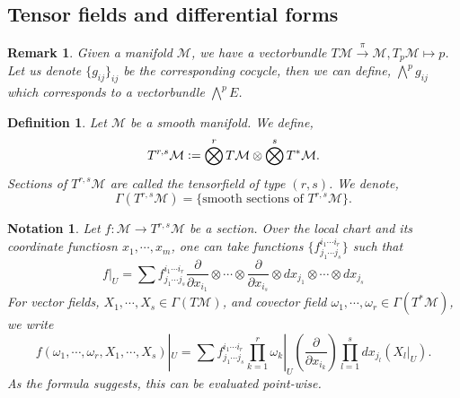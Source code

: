 \documentclass[8pt]{article}
\newtheorem{definition}{Definition}[section]
\newtheorem{notation}{Notation}[section]
\newtheorem{remark}{Remark}[section]
\newcommand{\defeq}{\vcentcolon=}
\newcommand{\M}[0]{\mathcal{M}}
\newcommand{\pd}[2]{{\frac {\partial #1} {\partial #2}}}
\begin{document}

\subsection{Tensor fields and differential forms}

\begin{remark}
  Given a manifold $\M$, we have a vectorbundle $T\M\stackrel{\pi}{\to}\M, T_p\M\mapsto p$. Let us denote $\{g_{ij}\}_{ij}$ be the corresponding cocycle, 
  then we can define, $\bigwedge^p g_{ij}$ which corresponds to a vectorbundle $\bigwedge^pE$. 
\end{remark}

\begin{definition}
  Let $\M$ be a smooth manifold. We define,
  \begin{equation*}
    T^{r,s}\M\defeq\bigotimes^rT\M\otimes\bigotimes^sT^*\M.
  \end{equation*}
  Sections of $T^{r,s}\M$ are called the tensorfield of type $(r,s)$. We denote,
  \begin{equation*}
    \Gamma(T^{r,s}\M) = \{\text{smooth sections of $T^{r,s}\M$}\}.
  \end{equation*}
\end{definition}

\begin{notation}
  Let $f:\M\to T^{r,s}\M$ be a section. Over the local chart and its coordinate functiosn $x_1,\cdots,x_m$, one can take functions $\{f_{j_1\cdots j_s}^{i_1\cdots i_r}\}$ such that
  \begin{equation}
    \label{local_chart_section}
        f|_U = \sum f_{j_1\cdots j_s}^{i_1\cdots i_r}\pd{}{x_{i_1}}\otimes\cdots\otimes \pd{}{x_{i_s}}\otimes dx_{j_1}\otimes \cdots\otimes dx_{j_s}
  \end{equation}
  For vector fields, $X_1,\cdots,X_s\in\Gamma(T\M)$, and covector field $\omega_1,\cdots,\omega_r\in\Gamma(T^*\M)$, we write 
  \begin{equation}
    \label{evaluation_section}
    f(\omega_1,\cdots,\omega_r,X_1,\cdots,X_s)|_U = \sum f_{j_1\cdots j_s}^{i_1\cdots i_r}\prod_{k=1}^r \omega_k|_U\left(\pd{}{x_{i_k}}\right)\prod_{l=1}^s dx_{j_l}(X_{l}|_U).
  \end{equation}
  As the formula suggests, this can be evaluated point-wise.
  \label{notation_section_evaluation}
\end{notation}
\end{document}
